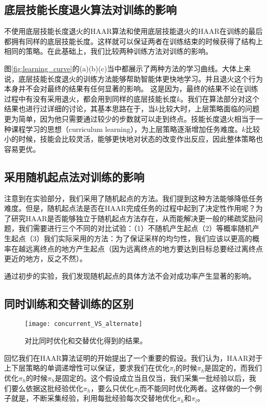\subsection{底层技能长度退火算法对训练的影响}
不使用底层技能长度退火的HAAR算法和使用底层技能退火的HAAR在训练的最后都拥有同样的底层技能长度。这样就可以保证两者在训练结束的时候获得了结构上相同的策略。在此基础上，我们比较两种训练方法对训练的影响。

图\ref{fig:learning_curve}的(a)(b)(c)当中都展示了两种方法的学习曲线。大体上来说，底层技能长度退火的训练方法能够帮助智能体更快地学习。并且退火这个行为本身并不会对最终的结果有任何显著的影响。 这是因为，最终的结果不论在训练过程中有没有采用退火，都会用到同样的底层技能长度$k$。我们在算法部分对这个结果也进行过详细的讨论，其基本思路在于，当$k$比较大时，上层策略面临的问题更为简单，因为他只需要通过较少的步数就可以走到终点。技能长度退火相当于一种课程学习的思想（curriculum learning），为上层策略逐渐增加任务难度。$k$比较小的时候，技能会比较灵活，能够更快地对状态的改变作出反应，因此整体策略也容易更优。

\subsection{采用随机起点法对训练的影响}
注意到在实验部分，我们采用了随机起点的方法。我们提到这种方法能够降低任务难度。但是，随机起点法是否在HAAR完成任务的过程中起到了决定性作用呢？为了研究HAAR是否能够独立于随机起点方法存在，从而能解决更一般的稀疏奖励问题，我们需要进行三个不同的对比试验：（1）不随机产生起点（2）等概率随机产生起点（3）我们实际采用的方法：为了保证采样的均匀性，我们应该以更高的概率在越远离终点的地方产生起点（因为远离终点的地方要达到目标总要经过离终点更近的地方，反之不然）。

通过初步的实验，我们发现随机起点的具体方法不会对成功率产生显著的影响。

\subsection{同时训练和交替训练的区别}
\label{appendix:concurrent}

\begin{figure}[!ht]
    \centering
    \texttt{[image: concurrent\_VS\_alternate]}
    \caption{对比同时优化和交替优化得到的结果。}
    \label{fig:concurrent}
\end{figure}

回忆我们在HAAR算法证明的开始提出了一个重要的假设。我们认为，HAAR对于上下层策略的单调递增性可以保证，要求我们在优化$\pi_l$的时候$\pi_h$是固定的，而我们优化$\pi_h$的时候$\pi_h$是固定的。这个假设成立当且仅当，我们采集一批经验以后，我们要么依据这批经验优化$\pi_h$，要么只优化$\pi_l$而不能同时优化两者。这样做的一个例子就是，不断采集经验，利用每批经验每次交替地优化$\pi_h$和$\pi_l$。

